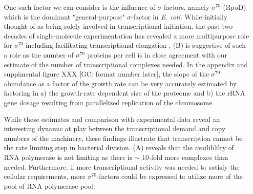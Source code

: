 One such factor we can consider is the influence of $\sigma$-factors, namely
$\sigma^{70}$ (RpoD) which is the dominant "general-purpose" $\sigma$-factor
in \textit{E. coli}. While initially thought of as being solely involved in
transcriptional initiation, the past two decades of single-molecule
experimentation has revealed a more multipurpose role for $\sigma^{70}$
including facilitating transcriptional elongation \citep{kapanidis2005,
goldman2015, perdue2011,mooney2003,mooney2005}.  (B) is
suggestive of such a role as the number of $\sigma^{70}$ proteins per cell is in
close agreement with our estimate of the number of transcriptional complexes
needed. In the appendix and supplmental figure XXX [GC: format number later],
the slope of the $\sigma^{70}$ abundance as a factor of the growth rate can be
very accurately estimated by factoring in a) the growth-rate dependent size of
the proteome and b) the rRNA gene dosage resulting from parallelized replication
of the chromosome. 

While these estimates and comparison with experimental data reveal an
interesting dynamic at play between the transcriptional demand and copy numbers
of the machinery, these findings illustrate that transcription cannot be the
rate limiting step in bacterial division.  (A) reveals that
the availiblilty of RNA polymerase is not limiting as there is $\sim$ 10-fold
more complexes than needed. Furthermore, if more transcriptional activity was
needed to satisfy the cellular requirements, more $\sigma^{70}$-factors could be
expressed to utilize more of the pool of RNA polymerase pool. 
